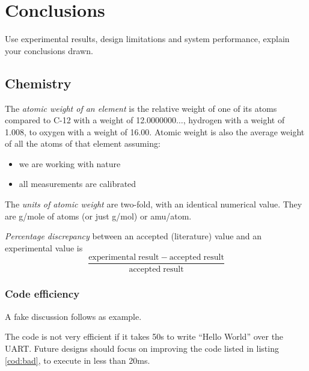 \documentclass[11pt,a4paper]{article}
\begin{document}
\section{Conclusions}
Use experimental results, design limitations and system performance, explain your conclusions drawn.

\subsection{Chemistry}
\begin{enumerate}
	\begin{item}
		The \emph{atomic weight of an element} is the relative weight of one of its atoms compared to C-12 with a weight of 12.0000000$\ldots$, hydrogen with a weight of 1.008, to oxygen with a weight of 16.00. Atomic weight is also the average weight of all the atoms of that element assuming:
		\begin{itemize}
			\item we are working with nature
			\item all measurements are calibrated
		\end{itemize}	
	\end{item}
	\begin{item}
		The \emph{units of atomic weight} are two-fold, with an identical numerical value. They are g/mole of atoms (or just g/mol) or amu/atom.
	\end{item}
	\begin{item}
		\emph{Percentage discrepancy} between an accepted (literature) value and an experimental value is
		\begin{equation}
			\frac{\mathrm{experimental\;result} - \mathrm{accepted\;result}}{\mathrm{accepted\;result}}
		\end{equation}
	\end{item}
\end{enumerate}

\subsubsection{Code efficiency}
A fake discussion follows as example.

The code is not very efficient if it takes 50s to write ``Hello World'' over the UART. Future designs should focus on improving the code listed in listing \ref{cod:bad}, to execute in less than 20ms.
\end{document}
